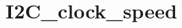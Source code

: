 \hypertarget{group___i2_c__clock__speed}{\section{I2\-C\-\_\-clock\-\_\-speed}
\label{group___i2_c__clock__speed}
}
